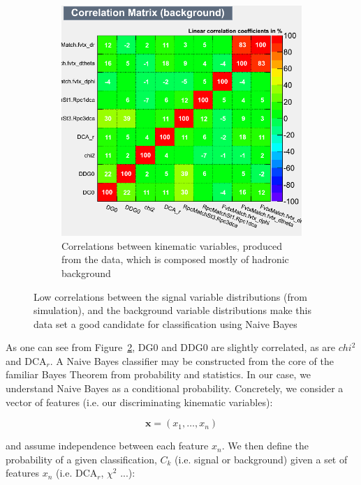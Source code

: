\begin{figure}[H]
\begin{subfigure}[t]{0.5\textwidth}
		\includegraphics[width=0.95\linewidth]{./figures/CorrelationMatrix_Background.png}
		\caption{Correlations between kinematic variables, produced from the data,
			which is composed mostly of hadronic background}
		\label{fig:corr_mat_bkg}
	\end{subfigure}
	\caption{ Low correlations between the signal variable distributions (from
		simulation), and the background variable distributions make this data set a
		good candidate for classification using Naive Bayes}
	\label{fig:kinematic_var_correlations}
\end{figure}

As one can see from Figure~\ref{fig:kinematic_var_correlations}, DG0 and DDG0
are slightly correlated, as are $chi^2$ and DCA$_r$. A Naive Bayes classifier
may be constructed from the core of the familiar Bayes Theorem from probability
and statistics. In our case, we understand Naive Bayes as a conditional
probability. Concretely, we consider a vector of features (i.e.  our
discriminating kinematic variables):

\begin{equation}
	\label{eq:feature_vector}
\mathbf{x} = (x_1, \dots, x_n)
\end{equation}

and assume independence between each feature $x_n$. We then define the
probability of a given classification, $C_k$ (i.e. signal or background) given a
set of features $x_n$ (i.e. DCA$_r$, $\chi^2$ ...):


